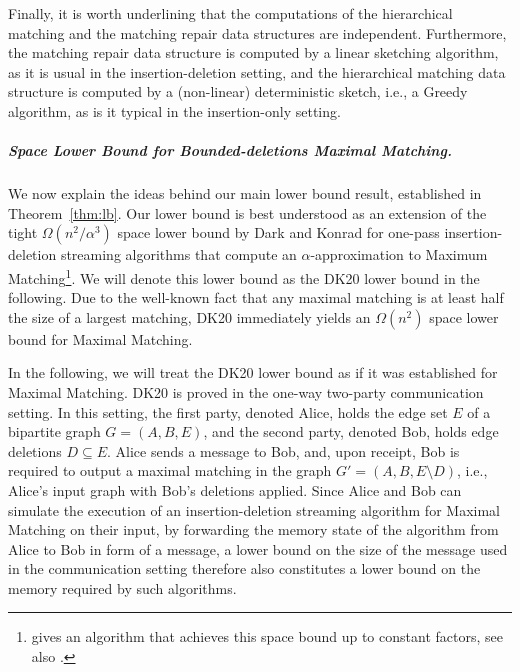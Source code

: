 \documentclass[11pt,a4paper]{article}
\begin{document}
Finally, it is worth underlining that the computations of the hierarchical matching and the matching repair data structures are independent. Furthermore, the matching repair data structure is computed by a linear sketching algorithm, as it is usual in the insertion-deletion setting, and the hierarchical matching data structure is computed by a (non-linear) deterministic sketch, i.e., a Greedy algorithm, as is it typical in the insertion-only setting. 


\subparagraph{Space Lower Bound for Bounded-deletions  \textsf{Maximal Matching}.}
We now explain the ideas behind our main lower bound result, established in Theorem~\ref{thm:lb}.
Our lower bound is best understood as an extension of the tight $\Omega(n^2 / \alpha^3)$ space lower bound by Dark and Konrad \cite{dk20} for one-pass insertion-deletion streaming algorithms that compute an $\alpha$-approximation to \textsf{Maximum Matching}\footnote{\cite{as22} gives an algorithm that achieves this space bound up to constant factors, see also \cite{k15,akl16,ccehmmv16}.}. We will denote this lower bound as the DK20 lower bound in the following. Due to the well-known fact that any maximal matching is at least half the size of a largest matching, DK20 immediately yields an $\Omega(n^2)$ space lower bound for \textsf{Maximal Matching}. 

In the following, we will treat the DK20 lower bound as if it was established for  \textsf{Maximal Matching}. DK20 is proved in the one-way two-party communication setting. In this setting, the first party, denoted Alice, holds the edge set $E$ of a bipartite graph $G=(A, B, E)$, and the second party, denoted Bob, holds edge deletions $D \subseteq E$. Alice sends a message to Bob, and, upon receipt, Bob is required to output a maximal matching in the graph $G' = (A, B, E \setminus D)$, i.e., Alice's input graph with Bob's deletions applied. Since Alice and Bob can simulate the execution of an insertion-deletion streaming algorithm for \textsf{Maximal Matching} on their input, by forwarding the memory state of the algorithm from Alice to Bob in form of a message, a lower bound on the size of the message used in the communication setting therefore also constitutes a lower bound on the memory required by such algorithms. 
\end{document}
